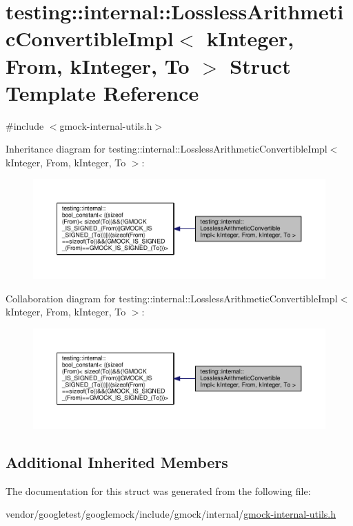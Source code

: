 \hypertarget{structtesting_1_1internal_1_1LosslessArithmeticConvertibleImpl_3_01kInteger_00_01From_00_01kInteger_00_01To_01_4}{}\section{testing\+:\+:internal\+:\+:Lossless\+Arithmetic\+Convertible\+Impl$<$ k\+Integer, From, k\+Integer, To $>$ Struct Template Reference}
\label{structtesting_1_1internal_1_1LosslessArithmeticConvertibleImpl_3_01kInteger_00_01From_00_01kInteger_00_01To_01_4}


{\ttfamily \#include $<$gmock-\/internal-\/utils.\+h$>$}



Inheritance diagram for testing\+:\+:internal\+:\+:Lossless\+Arithmetic\+Convertible\+Impl$<$ k\+Integer, From, k\+Integer, To $>$\+:\nopagebreak
\begin{figure}[H]
\begin{center}
\leavevmode
\includegraphics[width=350pt]{structtesting_1_1internal_1_1LosslessArithmeticConvertibleImpl_3_01kInteger_00_01From_00_01kInteedfb9e0d2309d16fae2503c192fdc7a4}
\end{center}
\end{figure}


Collaboration diagram for testing\+:\+:internal\+:\+:Lossless\+Arithmetic\+Convertible\+Impl$<$ k\+Integer, From, k\+Integer, To $>$\+:\nopagebreak
\begin{figure}[H]
\begin{center}
\leavevmode
\includegraphics[width=350pt]{structtesting_1_1internal_1_1LosslessArithmeticConvertibleImpl_3_01kInteger_00_01From_00_01kInteger_00_01To_01_4__coll__graph}
\end{center}
\end{figure}
\subsection*{Additional Inherited Members}


The documentation for this struct was generated from the following file\+:\begin{DoxyCompactItemize}
\item 
vendor/googletest/googlemock/include/gmock/internal/\hyperlink{gmock-internal-utils_8h}{gmock-\/internal-\/utils.\+h}\end{DoxyCompactItemize}
